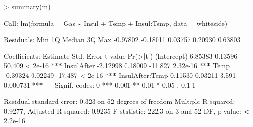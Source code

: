 \documentclass[
]{book}
\newenvironment{Shaded}{\begin{snugshade}}{\end{snugshade}}
\newcommand{\AttributeTok}[1]{\textcolor[rgb]{0.77,0.63,0.00}{#1}}
\newcommand{\DecValTok}[1]{\textcolor[rgb]{0.00,0.00,0.81}{#1}}
\newcommand{\ErrorTok}[1]{\textcolor[rgb]{0.64,0.00,0.00}{\textbf{#1}}}
\newcommand{\FloatTok}[1]{\textcolor[rgb]{0.00,0.00,0.81}{#1}}
\newcommand{\FunctionTok}[1]{\textcolor[rgb]{0.00,0.00,0.00}{#1}}
\newcommand{\NormalTok}[1]{#1}
\newcommand{\SpecialCharTok}[1]{\textcolor[rgb]{0.00,0.00,0.00}{#1}}
\newcommand{\StringTok}[1]{\textcolor[rgb]{0.31,0.60,0.02}{#1}}
\begin{document}
\begin{Shaded}
\begin{Highlighting}[]
\SpecialCharTok{\textgreater{}} \FunctionTok{summary}\NormalTok{(m)}

\NormalTok{Call}\SpecialCharTok{:}
\FunctionTok{lm}\NormalTok{(}\AttributeTok{formula =}\NormalTok{ Gas }\SpecialCharTok{\textasciitilde{}}\NormalTok{ Insul }\SpecialCharTok{+}\NormalTok{ Temp }\SpecialCharTok{+}\NormalTok{ Insul}\SpecialCharTok{:}\NormalTok{Temp, }\AttributeTok{data =}\NormalTok{ whiteside)}

\NormalTok{Residuals}\SpecialCharTok{:}
\NormalTok{     Min       1Q   Median       3Q      Max }
\SpecialCharTok{{-}}\FloatTok{0.97802} \SpecialCharTok{{-}}\FloatTok{0.18011}  \FloatTok{0.03757}  \FloatTok{0.20930}  \FloatTok{0.63803} 

\NormalTok{Coefficients}\SpecialCharTok{:}
\NormalTok{                Estimate Std. Error t value }\FunctionTok{Pr}\NormalTok{(}\SpecialCharTok{\textgreater{}}\ErrorTok{|}\NormalTok{t}\SpecialCharTok{|}\NormalTok{)    }
\NormalTok{(Intercept)      }\FloatTok{6.85383}    \FloatTok{0.13596}  \FloatTok{50.409}  \SpecialCharTok{\textless{}} \FloatTok{2e{-}16} \SpecialCharTok{**}\ErrorTok{*}
\NormalTok{InsulAfter      }\SpecialCharTok{{-}}\FloatTok{2.12998}    \FloatTok{0.18009} \SpecialCharTok{{-}}\FloatTok{11.827} \FloatTok{2.32e{-}16} \SpecialCharTok{**}\ErrorTok{*}
\NormalTok{Temp            }\SpecialCharTok{{-}}\FloatTok{0.39324}    \FloatTok{0.02249} \SpecialCharTok{{-}}\FloatTok{17.487}  \SpecialCharTok{\textless{}} \FloatTok{2e{-}16} \SpecialCharTok{**}\ErrorTok{*}
\NormalTok{InsulAfter}\SpecialCharTok{:}\NormalTok{Temp  }\FloatTok{0.11530}    \FloatTok{0.03211}   \FloatTok{3.591} \FloatTok{0.000731} \SpecialCharTok{**}\ErrorTok{*}
\SpecialCharTok{{-}{-}{-}}
\NormalTok{Signif. codes}\SpecialCharTok{:}  \DecValTok{0} \StringTok{\textquotesingle{}***\textquotesingle{}} \FloatTok{0.001} \StringTok{\textquotesingle{}**\textquotesingle{}} \FloatTok{0.01} \StringTok{\textquotesingle{}*\textquotesingle{}} \FloatTok{0.05} \StringTok{\textquotesingle{}.\textquotesingle{}} \FloatTok{0.1} \StringTok{\textquotesingle{} \textquotesingle{}} \DecValTok{1}

\NormalTok{Residual standard error}\SpecialCharTok{:} \FloatTok{0.323}\NormalTok{ on }\DecValTok{52}\NormalTok{ degrees of freedom}
\NormalTok{Multiple R}\SpecialCharTok{{-}}\NormalTok{squared}\SpecialCharTok{:}  \FloatTok{0.9277}\NormalTok{,    Adjusted R}\SpecialCharTok{{-}}\NormalTok{squared}\SpecialCharTok{:}  \FloatTok{0.9235} 
\NormalTok{F}\SpecialCharTok{{-}}\NormalTok{statistic}\SpecialCharTok{:} \FloatTok{222.3}\NormalTok{ on }\DecValTok{3}\NormalTok{ and }\DecValTok{52}\NormalTok{ DF,  p}\SpecialCharTok{{-}}\NormalTok{value}\SpecialCharTok{:} \ErrorTok{\textless{}} \FloatTok{2.2e{-}16}
\end{Highlighting}
\end{Shaded}
\end{document}

